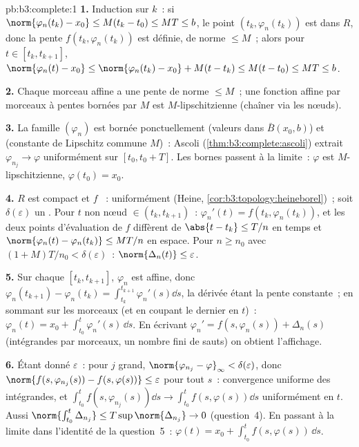 \begin{solution}{pb:b3:complete:1}
\textbf{1.} Induction sur $k$~: si $\norm{\varphi_n(t_k) -
x_0} \leq M(t_k - t_0) \leq MT \leq b$, le point $(t_k,
\varphi_n(t_k))$ est dans $R$, donc la pente $f(t_k,
\varphi_n(t_k))$ est définie, de norme $\leq M$~; alors pour
$t \in [t_k, t_{k+1}]$, $\norm{\varphi_n(t) - x_0} \leq
\norm{\varphi_n(t_k) - x_0} + M(t - t_k) \leq M(t - t_0)
\leq MT \leq b$.

\textbf{2.} Chaque morceau affine a une pente de norme $\leq
M$~; une fonction affine par morceaux à pentes bornées par
$M$ est $M$-lipschitzienne (chaîner via les nœuds).

\textbf{3.} La famille $(\varphi_n)$ est bornée
ponctuellement (valeurs dans $\bar B(x_0, b)$) et
 (constante de Lipschitz commune $M$)~: Ascoli
(\cref{thm:b3:complete:ascoli}) extrait $\varphi_{n_j} \to
\varphi$ uniformément sur $[t_0, t_0 + T]$. Les bornes
passent à la limite~: $\varphi$ est $M$-lipschitzienne,
$\varphi(t_0) = x_0$.

\textbf{4.} $R$ est compact et $f$ ~: uniformément
 (Heine, \cref{cor:b3:topology:heineborel})~; soit
$\delta(\varepsilon)$ un . Pour $t$ non nœud $\in
(t_k, t_{k+1})$~: $\varphi_n'(t) = f(t_k, \varphi_n(t_k))$,
et les deux points d'évaluation de $f$ diffèrent de $\abs{t -
t_k} \leq T/n$ en temps et $\norm{\varphi_n(t) -
\varphi_n(t_k)} \leq MT/n$ en espace. Pour $n \geq n_0$ avec
$(1 + M)T/n_0 < \delta(\varepsilon)$~: $\norm{\Delta_n(t)}
\leq \varepsilon$.

\textbf{5.} Sur chaque $[t_k, t_{k+1}]$, $\varphi_n$ est
affine, donc $\varphi_n(t_{k+1}) - \varphi_n(t_k) =
\int_{t_k}^{t_{k+1}} \varphi_n'(s)\dd s$, la dérivée étant
la pente constante~; en sommant sur les morceaux (et en
coupant le dernier en $t$)~: $\varphi_n(t) = x_0 +
\int_{t_0}^t\varphi_n'(s)\,\dd s$. En écrivant $\varphi_n' =
f(s, \varphi_n(s)) + \Delta_n(s)$ (intégrandes  par
morceaux, un nombre fini de sauts) on obtient l'affichage.

\textbf{6.} Étant donné $\varepsilon$~: pour $j$ grand,
$\norm{\varphi_{n_j} - \varphi}_\infty <
\delta(\varepsilon)$, donc $\norm{f(s, \varphi_{n_j}(s)) -
f(s, \varphi(s))} \leq \varepsilon$ pour tout $s$~:
convergence uniforme des intégrandes, et $\int_{t_0}^t
f(s,\varphi_{n_j}(s))\dd s \to \int_{t_0}^tf(s,
\varphi(s))\dd s$ uniformément en $t$. Aussi
$\norm{\int_{t_0}^t\Delta_{n_j}} \leq
T\sup\norm{\Delta_{n_j}} \to 0$ (question~4). En passant à
la limite dans l'identité de la question~5~: $\varphi(t) =
x_0 + \int_{t_0}^tf(s, \varphi(s))\,\dd s$.


\end{solution}
